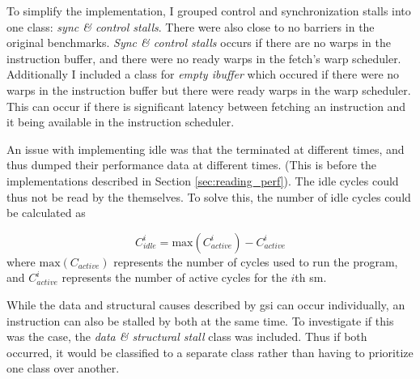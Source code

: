 To simplify the implementation, I grouped control and synchronization stalls into one class: \textit{sync \& control stalls}. There were also close to no barriers in the original benchmarks. \textit{Sync \& control stalls} occurs if there are no warps in the instruction buffer, and there were no ready warps in the fetch's warp scheduler. Additionally I included a class for \textit{empty ibuffer} which occured if there were no warps in the instruction buffer but there were ready warps in the warp scheduler. This can occur if there is significant latency between fetching an instruction and it being available in the instruction scheduler.

An issue with implementing idle was that the  terminated at different times, and thus dumped their performance data at different times. (This is before the implementations described in Section \ref{sec:reading_perf}). The idle cycles could thus  not be read by the  themselves. To solve this, the number of idle cycles could be calculated as

\begin{equation} \label{eq:idle}
    C^i_{idle} = \textrm{max}(C^i_{active}) - C^i_{active}
\end{equation}
\noindent
where $\textrm{max}(C_{active})$ represents the number of cycles used to run the program, and $C^i_{active}$ represents the number of active cycles for the $i$th \acrshort{sm}.

\noindent
While the data and structural causes described by \acrshort{gsi} can occur individually, an instruction can also be stalled by both at the same time. To investigate if this was the case, the \textit{data \& structural stall} class was included. Thus if both occurred, it would be classified to a separate class rather than having to prioritize one class over another.





